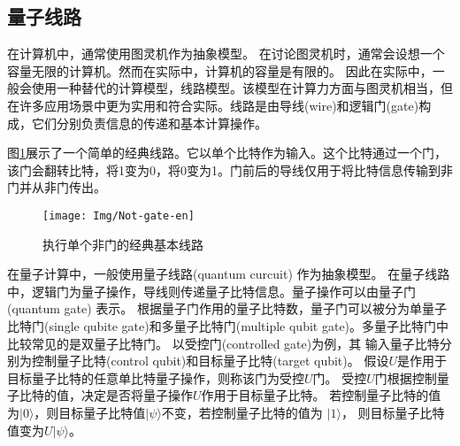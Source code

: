 \subsection{量子线路}
\label{sec-cir}
在计算机中，通常使用图灵机作为抽象模型。
在讨论图灵机时，通常会设想一个容量无限的计算机。然而在实际中，计算机的容量是有限的。
因此在实际中，一般会使用一种替代的计算模型，线路模型。该模型在计算力方面与图灵机相当，但在许多应用场景中更为实用和符合实际。线路是由导线(wire)和逻辑门(gate)构成，它们分别负责信息的传递和基本计算操作。
\begin{example}
    图\ref{fig-not}展示了一个简单的经典线路。它以单个比特作为输入。这个比特通过一个门，该门会翻转比特，将1变为0，将0变为1。门前后的导线仅用于将比特信息传输到非门并从非门传出。
\begin{figure}[htbp]
    \centering
    \texttt{[image: Img/Not-gate-en]}
    \caption{执行单个非门的经典基本线路}
    \label{fig-not}
\end{figure}
\end{example}

在量子计算中，一般使用量子线路(quantum curcuit) 作为抽象模型。
在量子线路中，逻辑门为量子操作，导线则传递量子比特信息。量子操作可以由量子门(quantum gate) 表示。
根据量子门作用的量子比特数，量子门可以被分为单量子比特门(single qubite gate)和多量子比特门(multiple qubit gate)。多量子比特门中比较常见的是双量子比特门。
以受控门(controlled gate)为例，其
输入量子比特分别为控制量子比特(control qubit)和目标量子比特(target qubit)。
假设$U $是作用于目标量子比特的任意单比特量子操作，则称该门为受控$U$门。
受控$U$门根据控制量子比特的值，决定是否将量子操作$U$作用于目标量子比特。
若控制量子比特的值为\(|0\rangle\)，则目标量子比特值\(|\psi\rangle\)不变，若控制量子比特的值为
\(|1\rangle\)， 则目标量子比特值变为\(U|\psi\rangle\)。


